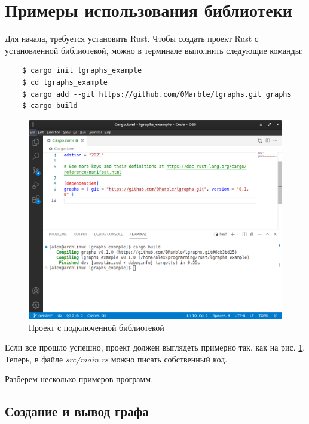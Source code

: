 \section{Примеры использования библиотеки}

Для начала, требуется установить Rust. Чтобы создать проект Rust с установленной библиотекой,
можно в терминале выполнить следующие команды:

\begin{verbatim}
    $ cargo init lgraphs_example
    $ cd lgraphs_example
    $ cargo add --git https://github.com/0Marble/lgraphs.git graphs
    $ cargo build
\end{verbatim}

\begin{figure}[b]
    \centering
    \includegraphics[scale=0.4]{static_images/install_example.png}
    \caption{Проект с подключенной библиотекой}
    \label{project-setup-image}
\end{figure}

Если все прошло успешно, проект должен выглядеть примерно так, как на рис. \ref{project-setup-image}.
Теперь, в файле \emph{src/main.rs} можно писать собственный код.

Разберем несколько примеров программ.

\subsection{Создание и вывод графа}

\inputminted[linenos]{rust}{../lgraphs/examples/helloworld.rs} \label{helloworld-program}

